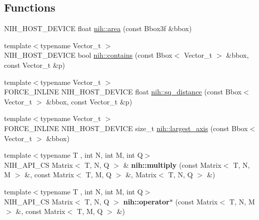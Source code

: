 \subsection*{\-Functions}
\begin{DoxyCompactItemize}
\item 
\-N\-I\-H\-\_\-\-H\-O\-S\-T\-\_\-\-D\-E\-V\-I\-C\-E float \hyperlink{group__linalg_gaceb0562c9b45c828b66c12f65bd85d8b}{nih\-::area} (const \-Bbox3f \&bbox)
\item 
{\footnotesize template$<$typename Vector\-\_\-t $>$ }\\\-N\-I\-H\-\_\-\-H\-O\-S\-T\-\_\-\-D\-E\-V\-I\-C\-E bool \hyperlink{group__linalg_gaddb50572c7ac110eddcc46bb6cf6fcc5}{nih\-::contains} (const \-Bbox$<$ \-Vector\-\_\-t $>$ \&bbox, const \-Vector\-\_\-t \&p)
\item 
{\footnotesize template$<$typename Vector\-\_\-t $>$ }\\\-F\-O\-R\-C\-E\-\_\-\-I\-N\-L\-I\-N\-E \-N\-I\-H\-\_\-\-H\-O\-S\-T\-\_\-\-D\-E\-V\-I\-C\-E float \hyperlink{group__linalg_gae81285029f77d03eb828a15fb90ffede}{nih\-::sq\-\_\-distance} (const \-Bbox$<$ \-Vector\-\_\-t $>$ \&bbox, const \-Vector\-\_\-t \&p)
\item 
{\footnotesize template$<$typename Vector\-\_\-t $>$ }\\\-F\-O\-R\-C\-E\-\_\-\-I\-N\-L\-I\-N\-E \-N\-I\-H\-\_\-\-H\-O\-S\-T\-\_\-\-D\-E\-V\-I\-C\-E size\-\_\-t \hyperlink{group__linalg_ga38d296764ec08b5bb7cb072460967e00}{nih\-::largest\-\_\-axis} (const \-Bbox$<$ \-Vector\-\_\-t $>$ \&bbox)
\item 
\hypertarget{group__linalg_ga9d891cd64a82aefc62f28dca0061a99f}{
{\footnotesize template$<$typename T , int \-N, int \-M, int \-Q$>$ }\\\-N\-I\-H\-\_\-\-A\-P\-I\-\_\-\-C\-S \-Matrix$<$ \-T, \-N, \-Q $>$ \& {\bfseries nih\-::multiply} (const \-Matrix$<$ \-T, \-N, \-M $>$ \&, const \-Matrix$<$ \-T, \-M, \-Q $>$ \&, \-Matrix$<$ \-T, \-N, \-Q $>$ \&)}
\label{group__linalg_ga9d891cd64a82aefc62f28dca0061a99f}

\item 
\hypertarget{group__linalg_gae27c9ec1c67d6ccc566ccef54d6134ec}{
{\footnotesize template$<$typename T , int \-N, int \-M, int \-Q$>$ }\\\-N\-I\-H\-\_\-\-A\-P\-I\-\_\-\-C\-S \-Matrix$<$ \-T, \-N, \-Q $>$ {\bfseries nih\-::operator$\ast$} (const \-Matrix$<$ \-T, \-N, \-M $>$ \&, const \-Matrix$<$ \-T, \-M, \-Q $>$ \&)}
\label{group__linalg_gae27c9ec1c67d6ccc566ccef54d6134ec}


\end{DoxyCompactItemize}
